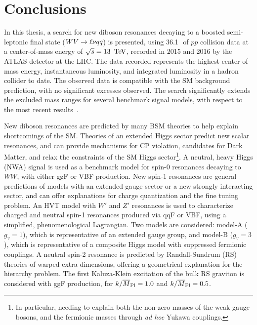 \chapter{Conclusions}
\label{sec:conclusions}

In this thesis, a search for new diboson resonances decaying to a boosted semi-leptonic final state ($WV\rightarrow\ell\nu qq$) is presented, using 36.1\,\ifb\, of $pp$ collision data at a center-of-mass energy of $\sqrt{s}=13\,\TeV$, recorded in 2015 and 2016 by the ATLAS detector at the LHC. The data recorded represents the highest center-of-mass energy, instantaneous luminosity, and integrated luminosity in a hadron collider to date. The observed data is compatible with the SM background prediction, with no significant excesses observed. The search significantly extends the excluded mass ranges for several benchmark signal models, with respect to the most recent results~\cite{diboson_comb_2016, ATLAS_comb_run1, lvjj_run1, CMS_diboson_run2, CMS_diboson_run1run2, CMS_dijet_run1, CMS_diboson_run1}.

New diboson resonances are predicted by many BSM theories to help explain shortcomings of the SM. Theories of an extended Higgs sector predict new scalar resonances, and can provide mechanisms for CP violation, candidates for Dark Matter, and relax the constraints of the SM Higgs sector\footnote{ 
In particular, needing to explain both the non-zero masses of the weak gauge bosons, and the fermionic masses through {\em ad hoc} Yukawa couplings. 
}. A neutral, heavy Higgs (NWA) signal is used as a benchmark model for spin-0 resonances decaying to $WW$, with either ggF or VBF production.  
New spin-1 resonances are general predictions of models with an extended gauge sector or a new strongly interacting sector, and can offer explanations for charge quantization and the fine tuning problem.  
An HVT model with $W'$ and $Z'$ resonances is used to characterize charged and neutral spin-1 resonances produced via qqF or VBF, using a simplified, phenomenological Lagrangian.  Two models are considered: model-A ($g_v=1$), which is representative of an extended gauge group, and model-B ($g_v=3$), which is representative of a composite Higgs model with suppressed fermionic couplings. A neutral spin-2 resonance is predicted by Randall-Sundrum (RS) theories of warped extra dimensions, offering a geometrical explanation for the hierarchy problem. The first Kaluza-Klein excitation of the bulk RS graviton is considered with ggF production, for $k/\overline{M}_{\rm Pl}=1.0$ and $k/\overline{M}_{\rm Pl}=0.5$. 

